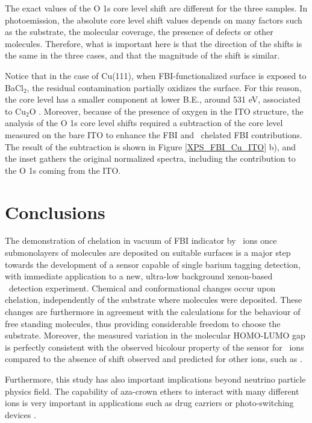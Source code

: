 \documentclass[aps,prl,reprint,longbibliography,superscriptaddress, english]{revtex4-1}
\def\BappCl{BaCl$_2$}
\begin{document}
The exact values of the O 1s core level shift are different for the three samples. In photoemission, the absolute core level shift values depends on many factors such as the substrate, the molecular coverage, the presence of defects or other molecules. Therefore, what is important here is that the direction of the shifts is the same in the three cases, and that the magnitude of the shift is similar. 

Notice that in the case of Cu(111), when FBI-functionalized surface is exposed to \BappCl, the residual contamination partially oxidizes the surface. For this reason, the core level has a smaller component at lower B.E., around 531 eV, associated to  Cu$_2$O \cite{zhu_surface_2013}. Moreover, because of the presence of oxygen in the ITO structure, the analysis of the O 1s core level shifts required a subtraction of the core level measured on the bare ITO to enhance the FBI and \Bapp\ chelated FBI contributions. The result of the subtraction is shown in Figure \ref{XPS_FBI_Cu_ITO} b), and the inset gathers the original normalized spectra, including the contribution to the  O 1s coming from the ITO.  


\section{Conclusions}
The demonstration of chelation in vacuum of FBI indicator by \Bapp\ ions once submonolayers of molecules are deposited on suitable surfaces is a major step towards the development of a sensor capable of single barium tagging detection, with immediate application to a new, ultra-low background xenon-based \bbonu\ detection experiment. Chemical and conformational changes occur upon chelation, independently of the substrate where molecules were deposited. These changes are furthermore in agreement with the calculations for the behaviour of free standing molecules, thus providing considerable freedom to choose the substrate. Moreover, the measured variation in the molecular HOMO-LUMO gap is perfectly consistent with the observed bicolour property of the sensor for \Bapp\ ions compared to the absence of shift observed and predicted for other ions, such as \Nap.  

Furthermore, this study has also important implications beyond neutrino particle physics field. The capability of {aza-crown ethers} to interact with many different ions is very important in applications such as drug carriers \cite{uchegbu_non-ionic_1998} or photo-switching devices \cite{malval_photoswitching_2002,uda_membrane_2005}. 
\end{document}
